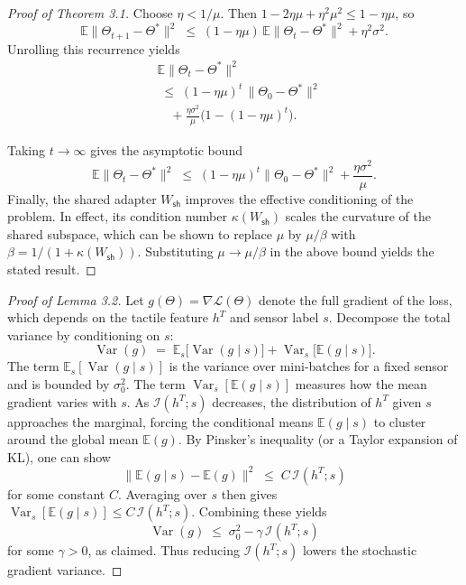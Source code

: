 \documentclass[letterpaper]{article} %
\theoremstyle{definition}                %
\theoremstyle{plain}                     %
\theoremstyle{remark}                    %
\DeclareMathOperator{\Var}{Var}
\begin{document}
\begin{proof}[Proof of Theorem 3.1]
Choose $\eta<1/\mu$.  Then $1 - 2\eta\mu + \eta^2\mu^2 \le 1 - \eta\mu$, so 
\[
\mathbb{E}\|\Theta_{t+1}-\Theta^*\|^2 \;\le\; (1 - \eta\mu)\,\mathbb{E}\|\Theta_t-\Theta^*\|^2 + \eta^2\sigma^2.
\]
Unrolling this recurrence yields 
\[
\begin{alignedat}{1}
&\mathbb{E}\|\Theta_t-\Theta^*\|^2 \\[2pt]
&\;\le\; (1-\eta\mu)^t\,\|\Theta_0-\Theta^*\|^2 \\ 
&\quad + \frac{\eta\sigma^2}{\mu}\bigl(1 - (1-\eta\mu)^t\bigr).
\end{alignedat}
\]

Taking $t\to\infty$ gives the asymptotic bound 
\[
\mathbb{E}\|\Theta_t-\Theta^*\|^2 \;\le\; (1 - \eta\mu)^t \|\Theta_0-\Theta^*\|^2 + \frac{\eta\sigma^2}{\mu}.
\]
Finally, the shared adapter $W_{\mathsf{sh}}$ improves the effective conditioning of the problem.  In effect, its condition number $\kappa(W_{\mathsf{sh}})$ scales the curvature of the shared subspace, which can be shown to replace $\mu$ by $\mu/\beta$ with $\beta=1/(1+\kappa(W_{\mathsf{sh}}))$.  Substituting $\mu\to\mu/\beta$ in the above bound yields the stated result.
\end{proof}

\begin{proof}[Proof of Lemma 3.2]
Let $g(\Theta)=\nabla\mathcal{L}(\Theta)$ denote the full gradient of the loss, which depends on the tactile feature $h^T$ and sensor label $s$.  Decompose the total variance by conditioning on $s$:
\[
\Var(g) \;=\; \mathbb{E}_s\bigl[\Var(g\mid s)\bigr] + \Var_s\bigl[\mathbb{E}(g\mid s)\bigr].
\]
The term $\mathbb{E}_s[\Var(g\mid s)]$ is the variance over mini-batches for a fixed sensor and is bounded by $\sigma_0^2$.  The term $\Var_s[\mathbb{E}(g\mid s)]$ measures how the mean gradient varies with $s$.  As $\mathcal{I}(h^T;s)$ decreases, the distribution of $h^T$ given $s$ approaches the marginal, forcing the conditional means $\mathbb{E}(g\mid s)$ to cluster around the global mean $\mathbb{E}(g)$.  By Pinsker’s inequality (or a Taylor expansion of KL), one can show 
\[
\bigl\|\mathbb{E}(g\mid s) - \mathbb{E}(g)\bigr\|^2 \;\le\; C\,\mathcal{I}(h^T;s)
\]
for some constant $C$.  Averaging over $s$ then gives $\Var_s[\mathbb{E}(g\mid s)] \le C\,\mathcal{I}(h^T;s)$.  Combining these yields
\[
\Var(g) \;\le\; \sigma_0^2 - \gamma\,\mathcal{I}(h^T;s)
\]
for some $\gamma>0$, as claimed.  Thus reducing $\mathcal{I}(h^T;s)$ lowers the stochastic gradient variance.
\end{proof}
\end{document}

